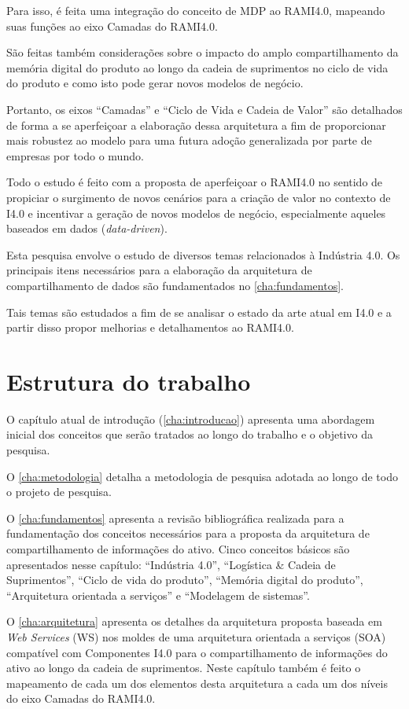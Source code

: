 	Para isso, é feita uma integração do conceito de MDP ao RAMI4.0, mapeando suas funções ao eixo Camadas do RAMI4.0.

	São feitas também considerações sobre o impacto do amplo compartilhamento da memória digital do produto ao longo da cadeia de suprimentos no ciclo de vida do produto e como isto pode gerar novos modelos de negócio.

	Portanto, os eixos ``Camadas'' e ``Ciclo de Vida e Cadeia de Valor'' são detalhados de forma a se aperfeiçoar a elaboração dessa arquitetura a fim de proporcionar mais robustez ao modelo para uma futura adoção generalizada por parte de empresas por todo o mundo.

	Todo o estudo é feito com a proposta de aperfeiçoar o RAMI4.0 no sentido de propiciar o surgimento de novos cenários para a criação de valor no contexto de I4.0 e incentivar a geração de novos modelos de negócio, especialmente aqueles baseados em dados (\textit{data-driven}).
	
	Esta pesquisa envolve o estudo de diversos temas relacionados à Indústria 4.0. Os principais itens necessários para a elaboração da arquitetura de compartilhamento de dados são fundamentados no \autoref{cha:fundamentos}.
	
	Tais temas são estudados a fim de se analisar o estado da arte atual em I4.0 e a partir disso propor melhorias e detalhamentos ao RAMI4.0.

\section{Estrutura do trabalho}

	O capítulo atual de introdução (\autoref{cha:introducao}) apresenta uma abordagem inicial dos conceitos que serão tratados ao longo do trabalho e o objetivo da pesquisa.
	
	O \autoref{cha:metodologia} detalha a metodologia de pesquisa adotada ao longo de todo o projeto de pesquisa.
	
	O \autoref{cha:fundamentos} apresenta a revisão bibliográfica realizada para a fundamentação dos conceitos necessários para a proposta da arquitetura de compartilhamento de informações do ativo. Cinco conceitos básicos são apresentados nesse capítulo: ``Indústria 4.0'', ``Logística \& Cadeia de Suprimentos'', ``Ciclo de vida do produto'', ``Memória digital do produto'', ``Arquitetura orientada a serviços'' e ``Modelagem de sistemas''.
	
	O \autoref{cha:arquitetura} apresenta os detalhes da arquitetura proposta baseada em \textit{Web Services} (WS) nos moldes de uma arquitetura orientada a serviços (SOA) compatível com Componentes I4.0 para o compartilhamento de informações do ativo ao longo da cadeia de suprimentos. Neste capítulo também é feito o mapeamento de cada um dos elementos desta arquitetura a cada um dos níveis do eixo Camadas do RAMI4.0.
	
